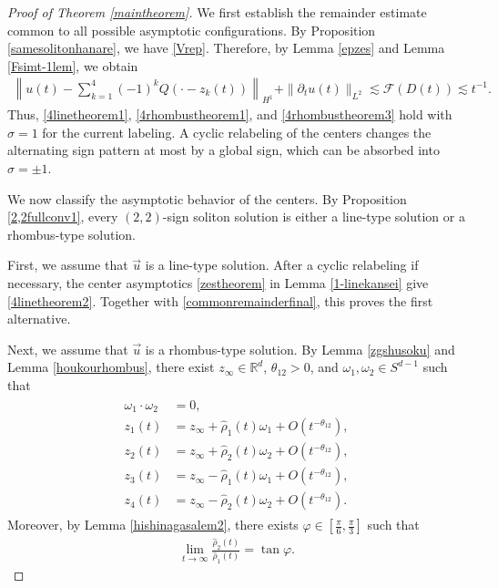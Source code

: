 \documentclass[reqno]{amsart}
\theoremstyle{plain}
\theoremstyle{definition}
\numberwithin{equation}{section}
\begin{document}
\begin{proof}[Proof of Theorem \ref{maintheorem}]

We first establish the remainder estimate common to all possible asymptotic configurations. By Proposition \ref{samesolitonhanare}, we have \eqref{Vrep}. Therefore, by Lemma \ref{epzes} and Lemma \ref{Fsimt-1lem}, we obtain
\begin{align}\label{commonremainderfinal}
\left\|u(t)-\sum_{k=1}^4(-1)^kQ(\cdot-z_k(t))\right\|_{H^1}+\|{\partial}_tu(t)\|_{L^2}\lesssim \mathcal{F}(D(t)) \lesssim t^{-1}.
\end{align}
Thus, \eqref{4linetheorem1}, \eqref{4rhombustheorem1}, and \eqref{4rhombustheorem3} hold with $\sigma=1$ for the current labeling. A cyclic relabeling of the centers changes the alternating sign pattern at most by a global sign, which can be absorbed into $\sigma=\pm1$.

We now classify the asymptotic behavior of the centers. By Proposition \ref{2,2fullconv1}, every $(2,2)$-sign soliton solution is either a line-type solution or a rhombus-type solution.

First, we assume that $\vec{u}$ is a line-type solution. After a cyclic relabeling if necessary, the center asymptotics \eqref{zestheorem} in Lemma \ref{1-linekansei} give \eqref{4linetheorem2}. Together with \eqref{commonremainderfinal}, this proves the first alternative.

Next, we assume that $\vec{u}$ is a rhombus-type solution. By Lemma \ref{zgshusoku} and Lemma \ref{houkourhombus}, there exist $z_{\infty}\in\mathbb{R}^d$, $\theta_{12}>0$, and $\omega_1,\omega_2\in S^{d-1}$ such that
\begin{align}\label{rhombusdirectionfinal}
\begin{aligned}
\omega_1\cdot\omega_2&=0,
\\
z_1(t)&=z_{\infty}+\hat{\rho}_1(t)\omega_1+O\left(t^{-\theta_{12}}\right),
\\
z_2(t)&=z_{\infty}+\hat{\rho}_2(t)\omega_2+O\left(t^{-\theta_{12}}\right),
\\
z_3(t)&=z_{\infty}-\hat{\rho}_1(t)\omega_1+O\left(t^{-\theta_{12}}\right),
\\
z_4(t)&=z_{\infty}-\hat{\rho}_2(t)\omega_2+O\left(t^{-\theta_{12}}\right).
\end{aligned}
\end{align}
Moreover, by Lemma \ref{hishinagasalem2}, there exists $\varphi\in\left[\frac{\pi}{6},\frac{\pi}{3}\right]$ such that
\begin{align*}
\lim_{t\to\infty}\frac{\hat{\rho}_2(t)}{\hat{\rho}_1(t)}=\tan\varphi.
\end{align*}


\end{proof}
\end{document}
